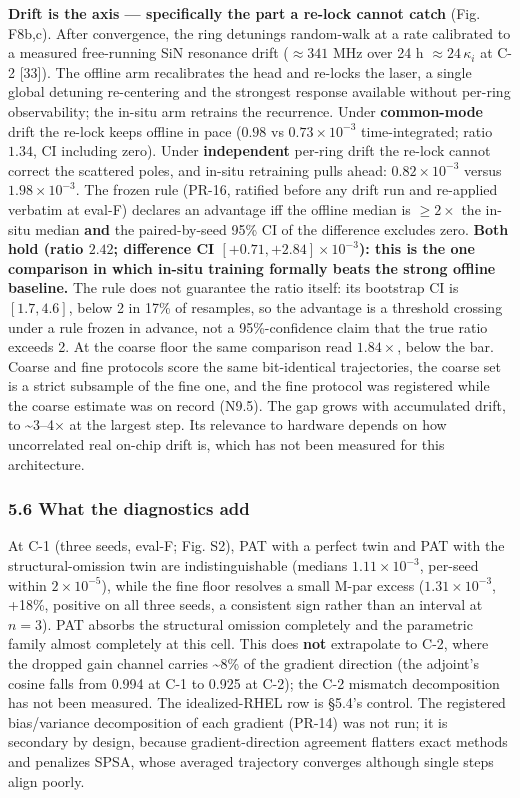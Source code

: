 \documentclass[
  10pt,
]{article}
\begin{document}
\textbf{Drift is the axis --- specifically the part a re-lock cannot
catch} (Fig. F8b,c). After convergence, the ring detunings random-walk
at a rate calibrated to a measured free-running SiN resonance drift
(\(\approx 341\) MHz over 24 h \(\approx 24\,\kappa_i\) at C-2
{[}33{]}). The offline arm recalibrates the head and re-locks the laser,
a single global detuning re-centering and the strongest response
available without per-ring observability; the in-situ arm retrains the
recurrence. Under \textbf{common-mode} drift the re-lock keeps offline
in pace (\(0.98\) vs \(0.73\times10^{-3}\) time-integrated; ratio
\(1.34\), CI including zero). Under \textbf{independent} per-ring drift
the re-lock cannot correct the scattered poles, and in-situ retraining
pulls ahead: \(0.82\times10^{-3}\) versus \(1.98\times10^{-3}\). The
frozen rule (PR-16, ratified before any drift run and re-applied
verbatim at eval-F) declares an advantage iff the offline median is
\(\ge 2\times\) the in-situ median \textbf{and} the paired-by-seed 95\%
CI of the difference excludes zero. \textbf{Both hold (ratio \(2.42\);
difference CI \([+0.71, +2.84]\times10^{-3}\)): this is the one
comparison in which in-situ training formally beats the strong offline
baseline.} The rule does not guarantee the ratio itself: its bootstrap
CI is \([1.7, 4.6]\), below 2 in 17\% of resamples, so the advantage is
a threshold crossing under a rule frozen in advance, not a
95\%-confidence claim that the true ratio exceeds 2. At the coarse floor
the same comparison read \(1.84\times\), below the bar. Coarse and fine
protocols score the same bit-identical trajectories, the coarse set is a
strict subsample of the fine one, and the fine protocol was registered
while the coarse estimate was on record (N9.5). The gap grows with
accumulated drift, to \textasciitilde3--4× at the largest step. Its
relevance to hardware depends on how uncorrelated real on-chip drift is,
which has not been measured for this architecture.

\subsubsection{5.6 What the diagnostics
add}\label{what-the-diagnostics-add}

At C-1 (three seeds, eval-F; Fig. S2), PAT with a perfect twin and PAT
with the structural-omission twin are indistinguishable (medians
\(1.11\times10^{-3}\), per-seed within \(2\times10^{-5}\)), while the
fine floor resolves a small M-par excess (\(1.31\times10^{-3}\), +18\%,
positive on all three seeds, a consistent sign rather than an interval
at \(n=3\)). PAT absorbs the structural omission completely and the
parametric family almost completely at this cell. This does \textbf{not}
extrapolate to C-2, where the dropped gain channel carries
\textasciitilde8\% of the gradient direction (the adjoint's cosine falls
from 0.994 at C-1 to 0.925 at C-2); the C-2 mismatch decomposition has
not been measured. The idealized-RHEL row is §5.4's control. The
registered bias/variance decomposition of each gradient (PR-14) was not
run; it is secondary by design, because gradient-direction agreement
flatters exact methods and penalizes SPSA, whose averaged trajectory
converges although single steps align poorly.
\end{document}

